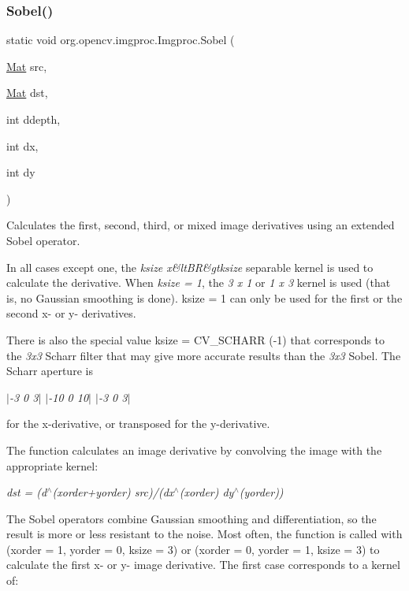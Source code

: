 \subsubsection{\texorpdfstring{Sobel()}{Sobel()}\hspace{0.1cm}{\footnotesize\ttfamily [3/3]}}
{\footnotesize\ttfamily static void org.\+opencv.\+imgproc.\+Imgproc.\+Sobel (\begin{DoxyParamCaption}\item[{\mbox{\hyperlink{classorg_1_1opencv_1_1core_1_1_mat}{Mat}}}]{src,  }\item[{\mbox{\hyperlink{classorg_1_1opencv_1_1core_1_1_mat}{Mat}}}]{dst,  }\item[{int}]{ddepth,  }\item[{int}]{dx,  }\item[{int}]{dy }\end{DoxyParamCaption})\hspace{0.3cm}{\ttfamily [static]}}

Calculates the first, second, third, or mixed image derivatives using an extended Sobel operator.

In all cases except one, the {\itshape ksize x\&lt\+BR\&gtksize} separable kernel is used to calculate the derivative. When {\itshape ksize = 1}, the {\itshape 3 x 1} or {\itshape 1 x 3} kernel is used (that is, no Gaussian smoothing is done). {\ttfamily ksize = 1} can only be used for the first or the second x-\/ or y-\/ derivatives.

There is also the special value {\ttfamily ksize = C\+V\+\_\+\+S\+C\+H\+A\+RR} (-\/1) that corresponds to the {\itshape 3x3} Scharr filter that may give more accurate results than the {\itshape 3x3} Sobel. The Scharr aperture is

{\itshape  $\vert$-\/3 0 3$\vert$ $\vert$-\/10 0 10$\vert$ $\vert$-\/3 0 3$\vert$ }

for the x-\/derivative, or transposed for the y-\/derivative.

The function calculates an image derivative by convolving the image with the appropriate kernel\+:

{\itshape dst = (d$^\wedge$(xorder+yorder) src)/(dx$^\wedge$(xorder) dy$^\wedge$(yorder))}

The Sobel operators combine Gaussian smoothing and differentiation, so the result is more or less resistant to the noise. Most often, the function is called with ({\ttfamily xorder} = 1, {\ttfamily yorder} = 0, {\ttfamily ksize} = 3) or ({\ttfamily xorder} = 0, {\ttfamily yorder} = 1, {\ttfamily ksize} = 3) to calculate the first x-\/ or y-\/ image derivative. The first case corresponds to a kernel of\+:

